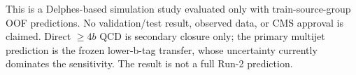 This is a Delphes-based simulation study evaluated only with train-source-group OOF predictions. No validation/test result, observed data, or CMS approval is claimed. Direct $\geq4b$ QCD is secondary closure only; the primary multijet prediction is the frozen lower-b-tag transfer, whose uncertainty currently dominates the sensitivity. The result is not a full Run-2 prediction.
